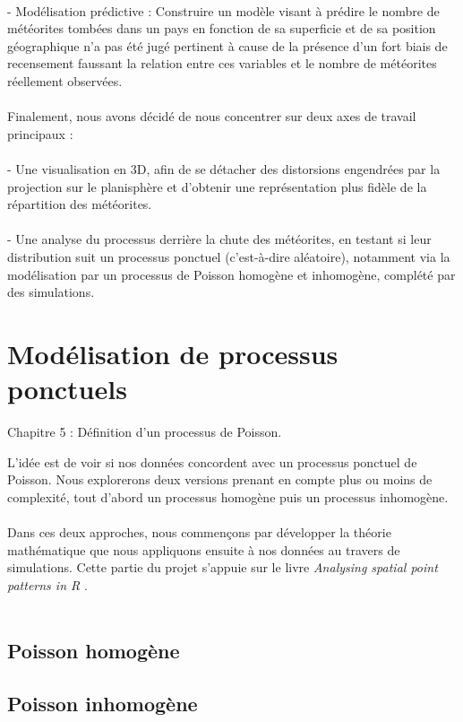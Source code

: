 \documentclass[12pt]{article}
\begin{document}
\\
- Modélisation prédictive : Construire un modèle visant à prédire le nombre de météorites tombées dans un pays en fonction de sa superficie et de sa position géographique n’a pas été jugé pertinent à cause de la présence d’un fort biais de recensement faussant la relation entre ces variables et le nombre de météorites réellement observées.\\
\\
Finalement, nous avons décidé de nous concentrer sur deux axes de travail principaux :\\
\\
- Une visualisation en 3D, afin de se détacher des distorsions engendrées par la projection sur le planisphère et d’obtenir une représentation plus fidèle de la répartition des météorites.\\
\\
- Une analyse du processus derrière la chute des météorites, en testant si leur distribution suit un processus ponctuel (c’est-à-dire aléatoire), notamment via la modélisation par un processus de Poisson homogène et inhomogène, complété par des simulations.

\section{Modélisation de processus ponctuels}
Chapitre 5 : Définition d'un processus de Poisson.

L'idée est de voir si nos données concordent avec un processus ponctuel de Poisson. Nous explorerons deux versions prenant en compte plus ou moins de complexité, tout d'abord un processus homogène puis un processus inhomogène.\\
\\
Dans ces deux approches, nous commençons par développer la théorie mathématique que nous appliquons ensuite à nos données au travers de simulations. Cette partie du projet s'appuie sur le livre \textit{Analysing spatial point patterns in R} \cite{analysing_spacial_points}.\\
\\
\subsection{Poisson homogène}

\subsection{Poisson inhomogène}
\end{document}
